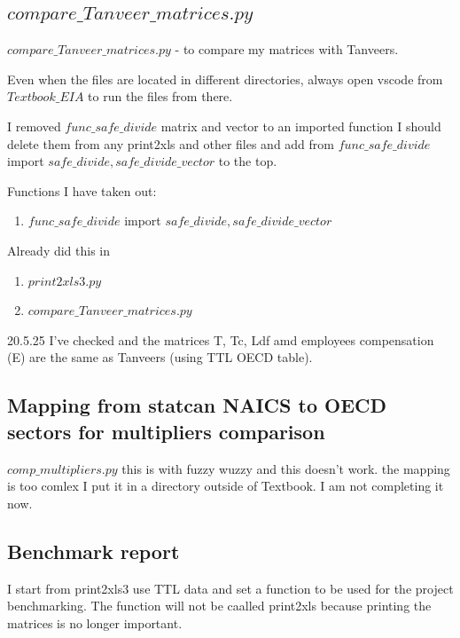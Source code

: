 \documentclass[12pt]{article}
\begin{document}
\subsection{$compare\_Tanveer\_matrices.py$}

$compare\_Tanveer\_matrices.py$ - to compare my matrices with Tanveers.

Even when the files are located in different directories, always open vscode from $Textbook\_EIA$ to run the files from there.

I removed $func\_safe\_divide$ matrix and vector to an imported function
I should delete them from any print2xls and other files and add from $func\_safe\_divide$ import $safe\_divide, safe\_divide\_vector$ to the top.

Functions I have taken out:
\begin{enumerate}
    \item $func\_safe\_divide$ import $safe\_divide, safe\_divide\_vector$
\end{enumerate}


Already did this in 
\begin{enumerate}
    \item $print2xls3.py$
    \item $compare\_Tanveer\_matrices.py$
\end{enumerate}


20.5.25 I've checked and the matrices T, Tc,  Ldf amd employees compensation (E) are the same as Tanveers (using TTL OECD table).




\subsection{Mapping from statcan NAICS to OECD sectors for multipliers comparison}

$comp\_multipliers.py$ this is with fuzzy wuzzy and this doesn't work. the mapping is too comlex
I put it in a directory outside of Textbook. I am not completing it now.


\subsection{Benchmark report}

I start from print2xls3 use TTL data and set a function to be used for the project benchmarking.
The function will not be caalled print2xls because printing the matrices is no longer important.
\end{document}
